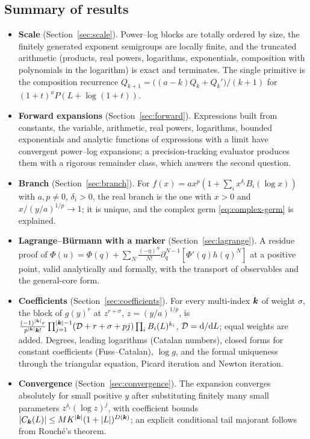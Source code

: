 \subsection{Summary of results}

\begin{itemize}[leftmargin=1.6em]
\item \textbf{Scale} (Section~\ref{sec:scale}). Power--log blocks are totally ordered by size, the finitely generated exponent semigroups are locally finite, and the truncated arithmetic (products, real powers, logarithms, exponentials, composition with polynomials in the logarithm) is exact and terminates. The single primitive is the composition recurrence $Q_{k+1}=\bigl((a-k)Q_k+Q_k'\bigr)/(k+1)$ for $(1+t)^aP(L+\log(1+t))$.
\item \textbf{Forward expansions} (Section~\ref{sec:forward}). Expressions built from constants, the variable, arithmetic, real powers, logarithms, bounded exponentials and analytic functions of expressions with a limit have convergent power--log expansions; a precision-tracking evaluator produces them with a rigorous remainder class, which answers the second question.
\item \textbf{Branch} (Section~\ref{sec:branch}). For $f(x)=ax^p(1+\sum_ix^{\delta_i}B_i(\log x))$ with $a,p\ne0$, $\delta_i>0$, the real branch is the one with $x>0$ and $x/(y/a)^{1/p}\to1$; it is unique, and the complex germ \eqref{eq:complex-germ} is explained.
\item \textbf{Lagrange--B\"urmann with a marker} (Section~\ref{sec:lagrange}). A residue proof of $\Phi(u)=\Phi(q)+\sum_N\frac{(-\eta)^N}{N!}\partial_q^{N-1}[\Phi'(q)h(q)^N]$ at a positive point, valid analytically and formally, with the transport of observables and the general-core form.
\item \textbf{Coefficients} (Section~\ref{sec:coefficients}). For every multi-index $\boldsymbol k$ of weight $\sigma$, the block of $g(y)^r$ at $z^{r+\sigma}$, $z=(y/a)^{1/p}$, is
 $\frac{(-1)^{|\boldsymbol k|}r}{p^{|\boldsymbol k|}\boldsymbol k!}\prod_{j=1}^{|\boldsymbol k|-1}(\mathcal D+r+\sigma+pj)\prod_iB_i(L)^{k_i}$, $\mathcal D=\mathrm d/\mathrm d L$; equal weights are added. Degrees, leading logarithms (Catalan numbers), closed forms for constant coefficients (Fuss--Catalan), $\log g$, and the formal uniqueness through the triangular equation, Picard iteration and Newton iteration.
\item \textbf{Convergence} (Section~\ref{sec:convergence}). The expansion converges absolutely for small positive $y$ after substituting finitely many small parameters $z^{\delta_i}(\log z)^j$, with coefficient bounds $|C_{\boldsymbol k}(L)|\le MK^{|\boldsymbol k|}(1+|L|)^{D(\boldsymbol k)}$; an explicit conditional tail majorant follows from Rouch\'e's theorem.

\end{itemize}
